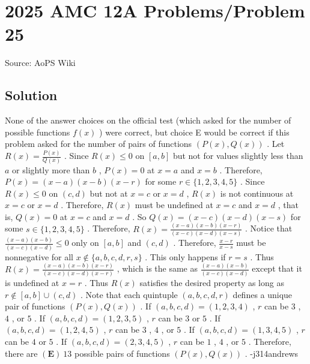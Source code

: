 \documentclass[12pt]{article}
\begin{document}
\section*{{2025 AMC 12A Problems/Problem 25}}
Source: AoPS Wiki

\subsection*{Solution}
None of the answer choices on the official test (which asked for the number of possible functions $f(x)$ ) were correct, but choice E would be correct if this problem asked for the number of pairs of functions $(P(x), Q(x))$ . Let $R(x) = \frac{P(x)}{Q(x)}$ . Since $R(x) \leq 0$ on $[a, b]$ but not for values slightly less than $a$ or slightly more than $b$ , $P(x) = 0$ at $x = a$ and $x = b$ . Therefore, $P(x) = (x-a)(x-b)(x-r)$ for some $r \in \{1, 2, 3, 4, 5\}$ . Since $R(x) \leq 0$ on $(c, d)$ but not at $x = c$ or $x = d$ , $R(x)$ is not continuous at $x = c$ or $x = d$ . Therefore, $R(x)$ must be undefined at $x = c$ and $x = d$ , that is, $Q(x) = 0$ at $x = c$ and $x = d$ . So $Q(x) = (x-c)(x-d)(x-s)$ for some $s \in \{1, 2, 3, 4, 5\}$ . Therefore, $R(x) = \frac{(x-a)(x-b)(x-r)}{(x-c)(x-d)(x-s)}$ . Notice that $\frac{(x-a)(x-b)}{(x-c)(x-d)} \leq 0$ only on $[a, b]$ and $(c, d)$ . Therefore, $\frac{x-r}{x-s}$ must be nonnegative for all $x \notin \{a, b, c, d, r, s\}$ . This only happens if $r = s$ . Thus $R(x) = \frac{(x-a)(x-b)(x-r)}{(x-c)(x-d)(x-r)}$ , which is the same as $\frac{(x-a)(x-b)}{(x-c)(x-d)}$ except that it is undefined at $x = r$ . Thus $R(x)$ satisfies the desired property as long as $r \notin [a, b] \cup (c, d)$ . Note that each quintuple $(a, b, c, d, r)$ defines a unique pair of functions $(P(x), Q(x))$ . If $(a, b, c, d) = (1, 2, 3, 4)$ , $r$ can be $3$ , $4$ , or $5$ . If $(a, b, c, d) = (1, 2, 3, 5)$ , $r$ can be $3$ or $5$ . If $(a, b, c, d) = (1, 2, 4, 5)$ , $r$ can be $3$ , $4$ , or $5$ . If $(a, b, c, d) = (1, 3, 4, 5)$ , $r$ can be $4$ or $5$ . If $(a, b, c, d) = (2, 3, 4, 5)$ , $r$ can be $1$ , $4$ , or $5$ . Therefore, there are $\boxed{(\textbf{E})\ 13}$ possible pairs of functions $(P(x), Q(x))$ . -j314andrews
\end{document}
